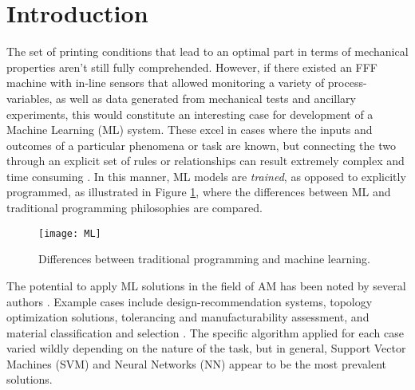 \documentclass[main.tex]{subfiles}
\begin{document}
\section{Introduction} \label{sec:ml_intr}

The set of printing conditions that lead to an optimal part in terms of mechanical properties aren't still fully comprehended. However, if there existed an FFF machine with in-line sensors that allowed monitoring a variety of process-variables, as well as data generated from mechanical tests and ancillary experiments, this would constitute an interesting case for development of a Machine Learning (ML) system. These excel in cases where the inputs and outcomes of a particular phenomena or task are known, but connecting the two through an explicit set of rules or relationships can result extremely complex and time consuming \cite{Chollet2018}. In this manner, ML models are \emph{trained}, as opposed to explicitly programmed, as illustrated in Figure \ref{fig:MLvsP}, where the differences between ML and traditional programming philosophies are compared. 

\begin{figure}[!htbp]
	\center
	\texttt{[image: ML]}
	\caption{Differences between traditional programming and machine learning. \cite{Chollet2018}} \label{fig:MLvsP}
\end{figure}

The potential to apply ML solutions in the field of AM has been noted by several authors \cite{Razvi2019,Meng2020}. Example cases include design-recommendation systems, topology optimization solutions, tolerancing and manufacturability assessment, and material classification and selection \cite{Razvi2019}. The specific algorithm applied for each case varied wildly depending on the nature of the task, but in general, Support Vector Machines (SVM) and Neural Networks (NN) appear to be the most prevalent solutions.
\end{document}
